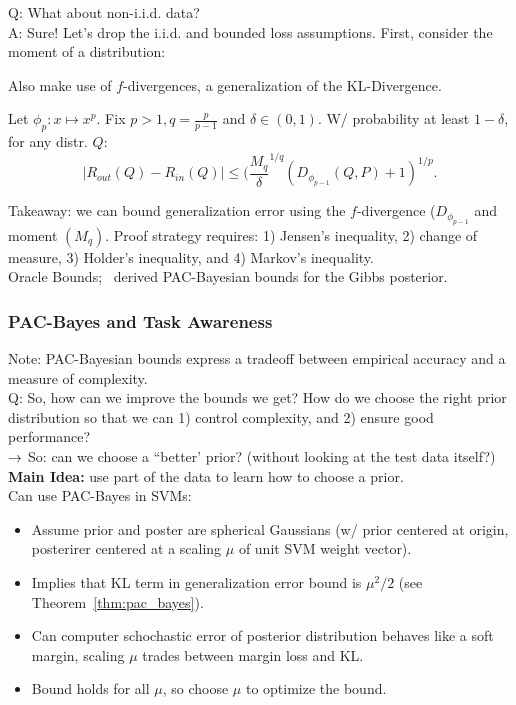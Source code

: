 Q: What about non-i.i.d. data? \\

A: Sure! Let's drop the i.i.d. and bounded loss assumptions. First, consider the moment of a distribution:
\ddef{Moment}{The $p$-th moment of a distribution is given by:
\[
M_p := \int \bE\left[|R_{in}(h) - R_{out}(h)|^p )\right) dP(h).
\]}

Also make use of $f$-divergences, a generalization of the KL-Divergence. \\

\begin{theorem}
Let $\phi_p : x \mapsto x^p$. Fix $p > 1, q = \frac{p}{p-1}$ and $\delta \in (0,1)$. W/ probability at least $1-\delta$, for any distr. $Q$:
\[
|R_{out}(Q) - R_{in}(Q)| \leq (\frac{M_q}{\delta}^{1/q}(D_{\phi_{p-1}}(Q,P) + 1)^{1/p}.
\]
\end{theorem}

Takeaway: we can bound generalization error using the $f$-divergence ($D_{\phi_{p-1}}$ and moment $(M_q)$. Proof strategy requires: 1) Jensen's inequality, 2) change of measure, 3) Holder's inequality, and 4) Markov's inequality. \\

Oracle Bounds;~\citet{catoni2007pac} derived PAC-Bayesian bounds for the Gibbs posterior.

\subsubsection{PAC-Bayes and Task Awareness}

Note: PAC-Bayesian bounds express a tradeoff between empirical accuracy and a measure of complexity. \\

Q: So, how can we improve the bounds we get? How do we choose the right prior distribution so that we can 1) control complexity, and 2) ensure good performance? \\

$\rightarrow$ So: can we choose a ``better' prior? (without looking at the test data itself?) \\

{\bf Main Idea:} use part of the data to learn how to choose a prior. \\

Can use PAC-Bayes in SVMs:
\begin{itemize}
    \item Assume prior and poster are spherical Gaussians (w/ prior centered at origin, posterirer centered at a scaling $\mu$ of unit SVM weight vector).
    \item Implies that KL term in generalization error bound is $\mu^2 / 2$ (see Theorem~\ref{thm:pac_bayes}).
    \item Can computer schochastic error of posterior distribution behaves like a soft margin, scaling $\mu$ trades between margin loss and KL.
    \item Bound holds for all $\mu$, so choose $\mu$ to optimize the bound.
\end{itemize}


